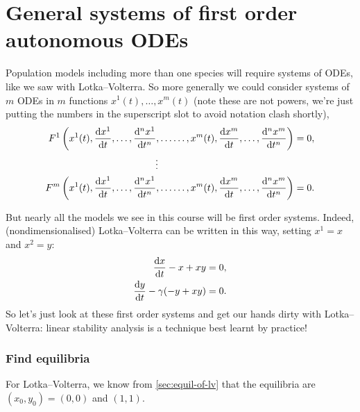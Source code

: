 \documentclass[main.tex]{subfiles}
\begin{document}
\section{General systems of first order autonomous ODEs}
\label{sec:gen-systems-of-aut-odes}
Population models including more than one species will require systems of ODEs, like we saw with Lotka--Volterra. So more generally we could consider systems of $m$ ODEs in $m$ functions $x^1(t),\dots, x^m(t)$ (note these are not powers, we're just putting the numbers in the superscript slot to avoid notation clash shortly),
\begin{align}
\nonumber F^1\left(x^1(t),\fd{x^1}{t},\dots,\fdn{n}{x^1}{t},\dots\dots, x^m(t),\fd{x^m}{t},\dots,\fdn{n}{x^m}{t}\right) &= 0,\\
\label{nonlinsys} \vdots \hspace{4.93cm} &\\
\nonumber F^m\left(x^1(t),\fd{x^1}{t},\dots,\fdn{n}{x^1}{t},\dots\dots, x^m(t),\fd{x^m}{t},\dots,\fdn{n}{x^m}{t}\right) &= 0.
\end{align}

But nearly all the models we see in this course will be first order systems. Indeed, (nondimensionalised) Lotka--Volterra can be written in this way, setting $x^1 =x$ and $x^2=y$: 
\begin{subequations}\label{lotvol2}
\begin{align}
\fd{x}{t} - x + xy &= 0,\\
\fd{y}{t}  -\gamma(-y + xy)&=0.
\end{align}
\end{subequations}
So let's just look at these first order systems and get our hands dirty with Lotka--Volterra: linear stability analysis is a technique best learnt by practice!  



\subsubsection*{\StepOne Find equilibria}
For Lotka--Volterra, we know from \cref{sec:equil-of-lv} that the equilibria are $(x_0,y_0) = (0,0)$ and $(1,1)$.
\end{document}
